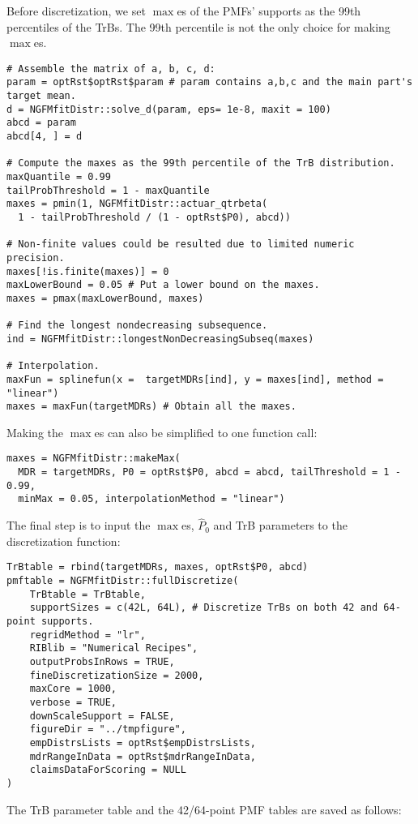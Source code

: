 \documentclass[12pt,letterpaper]{article}
\begin{document}
Before discretization, we set $\max$es of the PMFs' supports as the 99th percentiles of the TrBs. The 99th percentile is not the only choice for making $\max$es.
\begin{verbatim}
# Assemble the matrix of a, b, c, d:
param = optRst$optRst$param # param contains a,b,c and the main part's target mean.
d = NGFMfitDistr::solve_d(param, eps= 1e-8, maxit = 100)
abcd = param
abcd[4, ] = d

# Compute the maxes as the 99th percentile of the TrB distribution.
maxQuantile = 0.99
tailProbThreshold = 1 - maxQuantile
maxes = pmin(1, NGFMfitDistr::actuar_qtrbeta(
  1 - tailProbThreshold / (1 - optRst$P0), abcd))

# Non-finite values could be resulted due to limited numeric precision.
maxes[!is.finite(maxes)] = 0
maxLowerBound = 0.05 # Put a lower bound on the maxes.
maxes = pmax(maxLowerBound, maxes)

# Find the longest nondecreasing subsequence.
ind = NGFMfitDistr::longestNonDecreasingSubseq(maxes)

# Interpolation.
maxFun = splinefun(x =  targetMDRs[ind], y = maxes[ind], method = "linear")
maxes = maxFun(targetMDRs) # Obtain all the maxes.
\end{verbatim}
Making the $\max$es can also be simplified to one function call:
\begin{verbatim}
maxes = NGFMfitDistr::makeMax(
  MDR = targetMDRs, P0 = optRst$P0, abcd = abcd, tailThreshold = 1 - 0.99, 
  minMax = 0.05, interpolationMethod = "linear")
\end{verbatim}
The final step is to input the $\max$es, $\hat{P}_0$ and TrB parameters to the discretization function:
\begin{verbatim}
TrBtable = rbind(targetMDRs, maxes, optRst$P0, abcd)  
pmftable = NGFMfitDistr::fullDiscretize(
	TrBtable = TrBtable, 
	supportSizes = c(42L, 64L), # Discretize TrBs on both 42 and 64-point supports.
	regridMethod = "lr",
	RIBlib = "Numerical Recipes",
	outputProbsInRows = TRUE,
	fineDiscretizationSize = 2000,
	maxCore = 1000, 
	verbose = TRUE,
	downScaleSupport = FALSE,
	figureDir = "../tmpfigure",
	empDistrsLists = optRst$empDistrsLists,
	mdrRangeInData = optRst$mdrRangeInData,
	claimsDataForScoring = NULL
)
\end{verbatim}
The TrB parameter table and the 42/64-point PMF tables are saved as follows:
\end{document}
